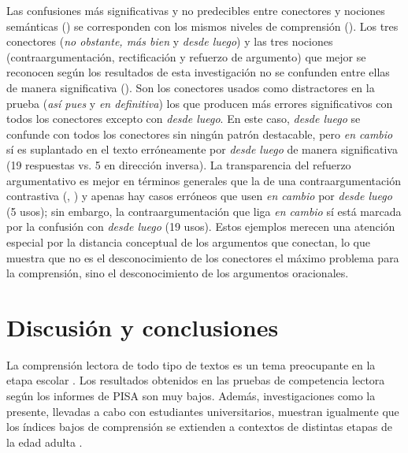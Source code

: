 \documentclass[spanish]{textolivre}
\begin{document}
Las confusiones más significativas y no predecibles entre conectores y nociones semánticas () se corresponden con los mismos niveles de comprensión (). Los tres conectores (\emph{no obstante, más bien} y \emph{desde luego}) y las tres nociones (contraargumentación, rectificación y refuerzo de argumento) que mejor se reconocen según los resultados de esta investigación no se confunden entre ellas de manera significativa (). Son los conectores usados como distractores en la prueba (\emph{así pues} y \emph{en definitiva}) los que producen más errores significativos con todos los conectores excepto con \emph{desde luego}. En este caso, \emph{desde luego} se confunde con todos los conectores sin ningún patrón destacable, pero \emph{en cambio} sí es suplantado en el texto erróneamente por \emph{desde luego} de manera significativa (19 respuestas vs. 5 en dirección inversa). La transparencia del refuerzo argumentativo es mejor en términos generales que la de una contraargumentación contrastiva (, ) y apenas hay casos erróneos que usen \textit{en cambio} por \emph{desde luego} (5 usos); sin embargo, la contraargumentación que liga \emph{en cambio} sí está marcada por la confusión con \emph{desde luego} (19 usos). Estos ejemplos merecen una atención especial por la distancia conceptual de los argumentos que conectan, lo que muestra que no es el desconocimiento de los conectores el máximo problema para la comprensión, sino el desconocimiento de los argumentos oracionales.



\section{Discusión y conclusiones}

La comprensión lectora de todo tipo de textos es un tema preocupante en la etapa escolar \cite{martin-ruiz_alisis_2022, caracas_sanchez_evaluacion_2019}. Los resultados obtenidos en las pruebas de competencia lectora según los informes de PISA \cite{ministeriodeeducacion2020} son muy bajos. Además, investigaciones como la presente, llevadas a cabo con estudiantes universitarios, muestran igualmente que los índices bajos de comprensión se extienden a contextos de distintas etapas de la edad adulta \cite{gatti2020comprension, duche_comprension_2022, guerra2022evaluacion}. 
\end{document}

